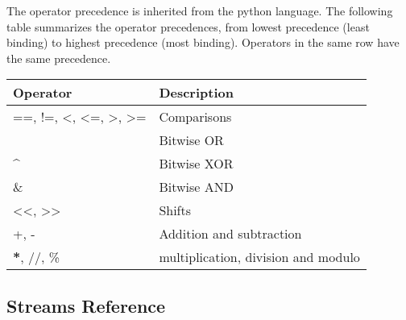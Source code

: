 \documentclass[letterpaper,10pt,english]{manual}
\begin{document}
The operator precedence is inherited from the python language. The following
table summarizes the operator precedences, from lowest precedence (least
binding) to highest precedence (most binding). Operators in the same row have
the same precedence.

\begin{tabulary}{\textwidth}{|L|L|}
\hline
\textbf{
Operator
} & \textbf{
Description
}\\
\hline

==, !=, \textless{}, \textless{}=, \textgreater{}, \textgreater{}=
 & 
Comparisons
\\
{\raggedright{}~}
 & 
Bitwise OR
\\

\textasciicircum{}
 & 
Bitwise XOR
\\

\&
 & 
Bitwise AND
\\

\textless{}\textless{}, \textgreater{}\textgreater{}
 & 
Shifts
\\

+, -
 & 
Addition and subtraction
\\

{\color{red}\bfseries{}*}, //, \%
 & 
multiplication, division and modulo
\\
\hline
\end{tabulary}



\subsection{Streams Reference}
\end{document}
